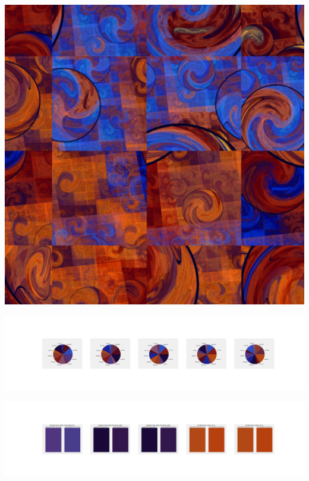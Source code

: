\documentclass[11pt]{article}
\begin{document}
\begin{landscape}
    \begin{center}
    \includegraphics[width=\textwidth]{./nbimg/file (262).jpg}
    \end{center}

    \begin{center}
    \includegraphics[width=250mm]{./nbimg/pie-181.jpg}
    \end{center}

    \begin{center}
    \includegraphics[width=250mm]{./nbimg/peak-181.jpg}
    \end{center}
    


\end{landscape}
\end{document}
